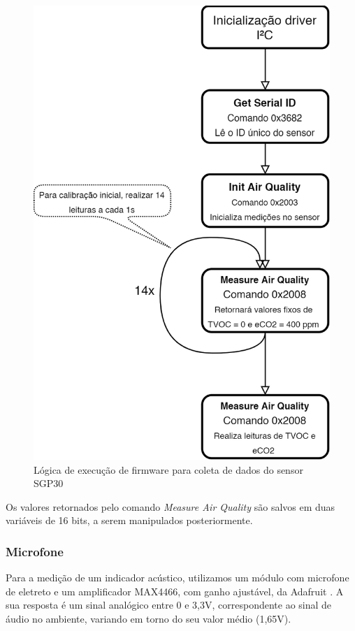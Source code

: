 \documentclass[../monografia.tex]{subfiles}
\begin{document}
\begin{figure}[h]
	\centering
	\includegraphics[scale=0.2]{sgp30_firmware.png}
	\caption{Lógica de execução de firmware para coleta de dados do sensor SGP30}
	\label{fig:sgp30_firmware}
\end{figure}

Os valores retornados pelo comando \textit{Measure Air Quality} são salvos em duas variáveis de 16 bits, a serem manipulados posteriormente.

\subsubsection{Microfone}

Para a medição de um indicador acústico, utilizamos um módulo com microfone de eletreto e um amplificador MAX4466, com ganho ajustável, da Adafruit \cite{max4466}.
A sua resposta é um sinal analógico entre 0 e 3,3V, correspondente ao sinal de áudio no ambiente, variando em torno do seu valor médio (1,65V). 
\end{document}
